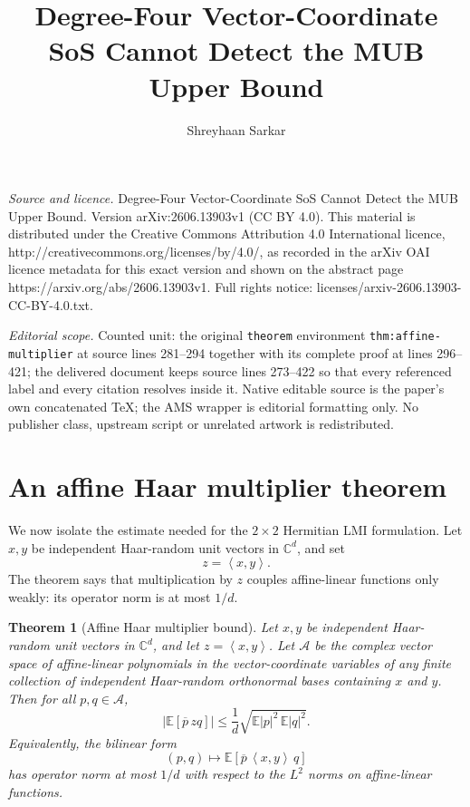 \documentclass[10pt,a4paper]{amsart}
\newtheorem{theorem}{Theorem}[section]
\newcommand{\C}{\mathbb{C}}
\newcommand{\E}{\mathbb{E}}
\newcommand{\ip}[2]{\left\langle #1,#2\right\rangle}
\begin{document}
\title[Degree-Four Vector-Coordinate SoS Cannot Detect the MUB Uppe]{Degree-Four Vector-Coordinate SoS Cannot Detect the MUB Upper Bound}
\author{Shreyhaan Sarkar}
\date{}
\maketitle
\noindent\emph{Source and licence.} Degree-Four Vector-Coordinate SoS Cannot Detect the MUB Upper Bound. Version arXiv:2606.13903v1 (CC BY 4.0). This material is distributed under the Creative Commons Attribution 4.0 International licence, http://creativecommons.org/licenses/by/4.0/, as recorded in the arXiv OAI licence metadata for this exact version and shown on the abstract page https://arxiv.org/abs/2606.13903v1. Full rights notice: licenses/arxiv-2606.13903-CC-BY-4.0.txt.\par\smallskip
\noindent\textit{Editorial scope.} Counted unit: the original \texttt{theorem} environment \texttt{thm:affine-multiplier} at source lines 281--294 together with its complete proof at lines 296--421; the delivered document keeps source lines 273--422 so that every referenced label and every citation resolves inside it. Native editable source is the paper's own concatenated TeX; the AMS wrapper is editorial formatting only. No publisher class, upstream script or unrelated artwork is redistributed.
\section{An affine Haar multiplier theorem}

We now isolate the estimate needed for the $2\times2$ Hermitian LMI formulation. Let $x,y$ be independent Haar-random unit vectors in $\C^d$, and set
\[
z=\ip{x}{y}.
\]
The theorem says that multiplication by $z$ couples affine-linear functions only weakly: its operator norm is at most $1/d$.


\begin{theorem}[Affine Haar multiplier bound]\label{thm:affine-multiplier}
Let $x,y$ be independent Haar-random unit vectors in $\C^d$, and let $z=\ip{x}{y}$. Let $\mathcal A$ be the complex vector space of affine-linear polynomials in the vector-coordinate variables of any finite collection of independent Haar-random orthonormal bases containing $x$ and $y$. Then for all $p,q\in\mathcal A$,
\[
\left|\E[\overline p\,zq]\right|
\le
\frac1d
\sqrt{\E|p|^2\,\E|q|^2}.
\]
Equivalently, the bilinear form
\[
(p,q)\longmapsto \E[\overline p\,\ip{x}{y}\,q]
\]
has operator norm at most $1/d$ with respect to the $L^2$ norms on affine-linear functions.
\end{theorem}
\end{document}
